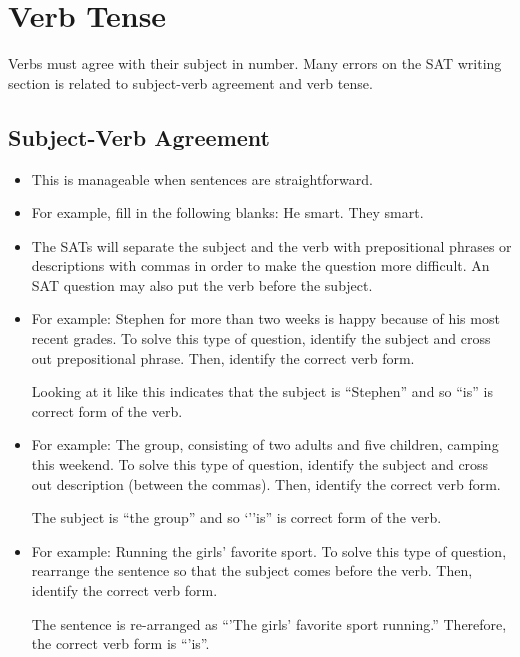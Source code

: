 \section{Verb Tense}

Verbs must agree with their subject in number. Many errors on the SAT writing section is related to subject-verb agreement and verb tense.
\subsection{Subject-Verb Agreement}

\begin{itemize}
\item{This is manageable when sentences are straightforward.}
\item{For example, fill in the following blanks: He smart. They \underline{\hspace{2in}} smart.}
\item{The SATs will separate the subject and the verb with prepositional phrases or descriptions
with commas in order to make the question more difficult. An SAT question may also put
the verb before the subject.}
\item{For example: Stephen for more than two weeks is happy because of his most recent grades. To solve
this type of question, identify the subject and cross out prepositional phrase. Then, identify
the correct verb form.}

\bigskip
Looking at it like this indicates that the subject is ``Stephen'' and so ``is'' is correct form of
the verb.

\item{For example: The group, consisting of two adults and five children, camping this weekend. To solve this type of question, identify the subject and cross out description (between the commas). Then, identify the correct verb form.}

\bigskip
The subject is ``the group'' and so `''is'' is correct form of the verb.

\item{For example: Running the girls' favorite sport. To solve this type of question, rearrange the sentence so that the subject comes before the verb. Then, identify the correct verb form.}

\bigskip
The sentence is re-arranged as ``'The girls' favorite sport \underline{\hspace{2in}} running.'' Therefore, the correct verb form is ``'is''.

\end{itemize}

